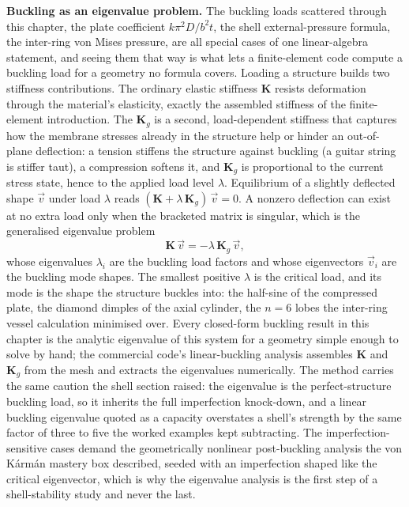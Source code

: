 \begin{mastery}
\textbf{Buckling as an eigenvalue problem.} The buckling loads scattered
through this chapter, the plate coefficient $k\pi^2D/b^2t$, the shell
external-pressure formula, the inter-ring von Mises pressure, are all special
cases of one linear-algebra statement, and seeing them that way is what lets a
finite-element code compute a buckling load for a geometry no formula covers.
Loading a structure builds two stiffness contributions. The ordinary elastic
stiffness $\mathbf{K}$ resists deformation through the material's elasticity,
exactly the assembled stiffness of the finite-element introduction. The
 $\mathbf{K}_g$ is a second, load-dependent
stiffness that captures how the membrane stresses already in the structure
help or hinder an out-of-plane deflection: a tension stiffens the structure
against buckling (a guitar string is stiffer taut), a compression softens it,
and $\mathbf{K}_g$ is proportional to the current stress state, hence to the
applied load level $\lambda$. Equilibrium of a slightly deflected shape
$\vec{v}$ under load $\lambda$ reads $(\mathbf{K} + \lambda\,\mathbf{K}_g)\,
\vec{v} = 0$. A nonzero deflection can exist at no extra load only when the
bracketed matrix is singular, which is the generalised eigenvalue problem
\[
\mathbf{K}\,\vec{v} = -\lambda\,\mathbf{K}_g\,\vec{v},
\]
whose eigenvalues $\lambda_i$ are the buckling load factors and whose
eigenvectors $\vec{v}_i$ are the buckling mode shapes. The smallest positive
$\lambda$ is the critical load, and its mode is the shape the structure buckles
into: the half-sine of the compressed plate, the diamond dimples of the axial
cylinder, the $n=6$ lobes the inter-ring vessel calculation minimised over.
Every closed-form buckling result in this chapter is the analytic eigenvalue of
this system for a geometry simple enough to solve by hand; the commercial
code's linear-buckling analysis assembles $\mathbf{K}$ and $\mathbf{K}_g$ from
the mesh and extracts the eigenvalues numerically. The method carries the same
caution the shell section raised: the eigenvalue is the perfect-structure
buckling load, so it inherits the full imperfection knock-down, and a linear
buckling eigenvalue quoted as a capacity overstates a shell's strength by the
same factor of three to five the worked examples kept subtracting. The
imperfection-sensitive cases demand the geometrically nonlinear post-buckling
analysis the von K\'arm\'an mastery box described, seeded with an imperfection
shaped like the critical eigenvector, which is why the eigenvalue analysis is
the first step of a shell-stability study and never the last.
\end{mastery}

